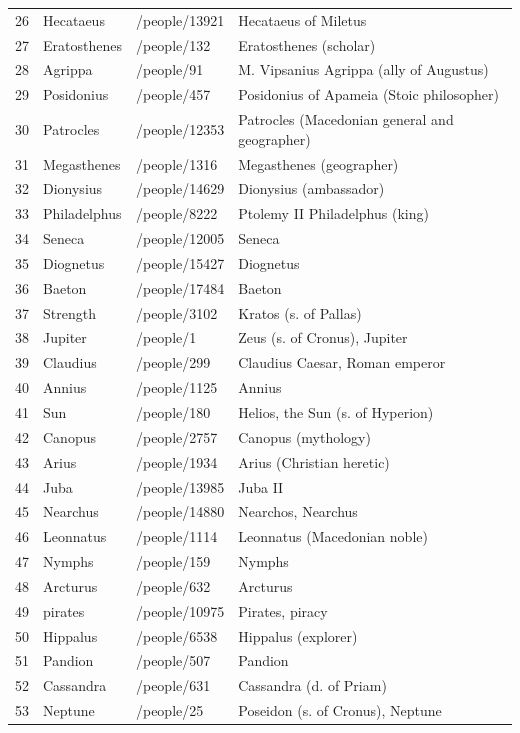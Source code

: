 \documentclass[
  12pt,
]{article}
\begin{document}
\begin{longtable}[]{@{}llll@{}}
26 & Hecataeus & /people/13921 & Hecataeus of Miletus \\
27 & Eratosthenes & /people/132 & Eratosthenes (scholar) \\
28 & Agrippa & /people/91 & M. Vipsanius Agrippa (ally of Augustus) \\
29 & Posidonius & /people/457 & Posidonius of Apameia (Stoic
philosopher) \\
30 & Patrocles & /people/12353 & Patrocles (Macedonian general and
geographer) \\
31 & Megasthenes & /people/1316 & Megasthenes (geographer) \\
32 & Dionysius & /people/14629 & Dionysius (ambassador) \\
33 & Philadelphus & /people/8222 & Ptolemy II Philadelphus (king) \\
34 & Seneca & /people/12005 & Seneca \\
35 & Diognetus & /people/15427 & Diognetus \\
36 & Baeton & /people/17484 & Baeton \\
37 & Strength & /people/3102 & Kratos (s. of Pallas) \\
38 & Jupiter & /people/1 & Zeus (s. of Cronus), Jupiter \\
39 & Claudius & /people/299 & Claudius Caesar, Roman emperor \\
40 & Annius & /people/1125 & Annius \\
41 & Sun & /people/180 & Helios, the Sun (s. of Hyperion) \\
42 & Canopus & /people/2757 & Canopus (mythology) \\
43 & Arius & /people/1934 & Arius (Christian heretic) \\
44 & Juba & /people/13985 & Juba II \\
45 & Nearchus & /people/14880 & Nearchos, Nearchus \\
46 & Leonnatus & /people/1114 & Leonnatus (Macedonian noble) \\
47 & Nymphs & /people/159 & Nymphs \\
48 & Arcturus & /people/632 & Arcturus \\
49 & pirates & /people/10975 & Pirates, piracy \\
50 & Hippalus & /people/6538 & Hippalus (explorer) \\
51 & Pandion & /people/507 & Pandion \\
52 & Cassandra & /people/631 & Cassandra (d. of Priam) \\
53 & Neptune & /people/25 & Poseidon (s. of Cronus), Neptune \\

\end{longtable}
\end{document}
